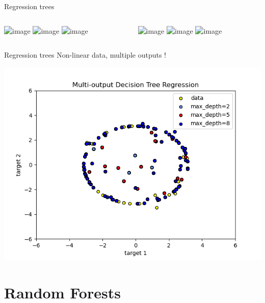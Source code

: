 \documentclass{irdbeamer}
\begin{document}
\begin{frame}{Regression trees}
\begin{columns}
    \begin{column}[t]{0.5\textwidth}
\centering
    \includegraphics<1>[width=\textwidth]{./figs/regression.png}%
    \includegraphics<2>[width=\textwidth]{./figs/regression2.png}%
    \includegraphics<3>[width=\textwidth]{./figs/regression3.png}%
\end{column}
    \begin{column}[t]{0.5\textwidth}
\centering
    \includegraphics<1>[width=\textwidth]{./figs/regression_tree.png}%
    \includegraphics<2>[width=\textwidth]{./figs/regression_tree2.png}%
    \includegraphics<3>[width=\textwidth]{./figs/regression_tree3.png}%
\end{column}
\end{columns}
\end{frame}

\begin{frame}{Regression trees}
\centering
Non-linear data, multiple outputs !

    \includegraphics[width=.5\textwidth]{./figs/non-linear.png}%
\end{frame}


\section{Random Forests}

\begin{frame}{}
\end{frame}
\end{document}
